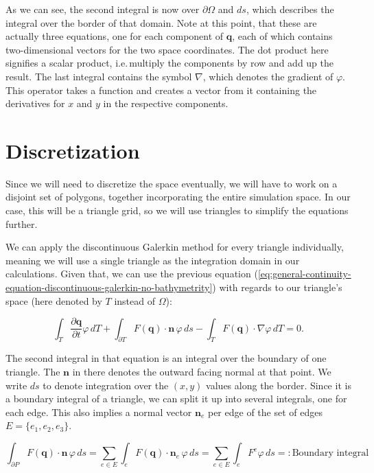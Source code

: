 \documentclass[a4paper, twoside]{article}
\newcommand{\pd}[2]{\dfrac{\partial #1}{\partial #2}}
\renewcommand{\phi}{\varphi}
\begin{document}
As we can see, the second integral is now over $\partial \Omega$ and $ds$, which describes the integral over the border of that domain.
Note at this point, that these are actually three equations, one for each component of $\mathbf{q}$, each of which contains two-dimensional vectors for the two space coordinates.
The dot product here signifies a scalar product, i.e.\,multiply the components by row and add up the result.
The last integral contains the symbol $\nabla$, which denotes the gradient of $\phi$.
This operator takes a function and creates a vector from it containing the derivatives for $x$ and $y$ in the respective components.

\section{Discretization}
\label{sec:discretization}

Since we will need to discretize the space eventually, we will have to work on a disjoint set of polygons, together incorporating the entire simulation space.
In our case, this will be a triangle grid, so we will use triangles to simplify the equations further.

We can apply the discontinuous Galerkin method for every triangle individually, meaning we will use a single triangle as the integration domain in our calculations.
Given that, we can use the previous equation (\ref{eq:general-continuity-equation-discontinuous-galerkin-no-bathymetrity}) with regards to our triangle's space (here denoted by $T$ instead of $\Omega$):

\begin{equation}
  \label{eq:shallow-water-weak-form-div-applied-triangle}
  \int_T \pd {\mathbf{q}}{t} \phi \, dT +
  \int_{\partial T} F(\mathbf{q}) \cdot \mathbf{n} \, \phi \, ds -
  \int_T F(\mathbf{q}) \cdot \nabla \phi \, dT = 0.
\end{equation}

The second integral in that equation is an integral over the boundary of one triangle.
The $\mathbf{n}$ in there denotes the outward facing normal at that point.
We write $ds$ to denote integration over the $(x,y)$ values along the border.
Since it is a boundary integral of a triangle, we can split it up into several integrals, one for each edge.
This also implies a normal vector $\mathbf{n}_e$ per edge of the set of edges $E = \{e_1, e_2, e_3\}$.

\begin{equation}
  \label{eq:boundary-integral-sum}
  \int_{\partial P} F(\mathbf{q}) \cdot \mathbf{n} \, \phi \, ds = \sum_{e \in E} \int_{e} F(\mathbf{q}) \cdot \mathbf{n}_e \, \phi \, ds = \sum_{e \in E} \int_{e} F^e \phi \, ds =: \text{Boundary integral}
\end{equation}
\end{document}
